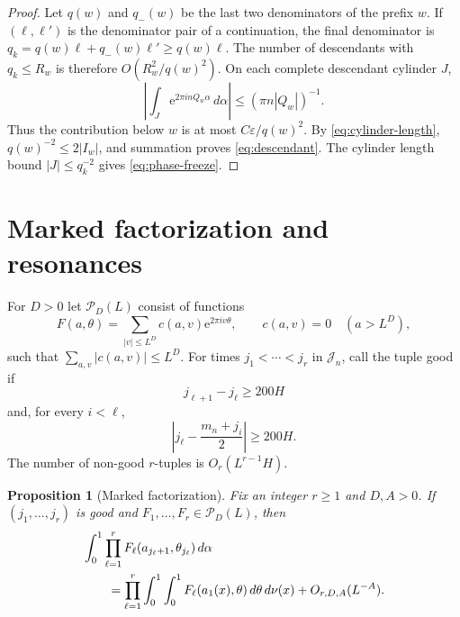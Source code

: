 \documentclass[11pt,a4paper]{amsart}
\newtheorem{proposition}[theorem]{Proposition}
\theoremstyle{definition}
\theoremstyle{remark}
\newcommand{\e}{\mathrm e}
\begin{document}
\begin{proof}
Let $q(w)$ and $q_-(w)$ be the last two denominators of the prefix $w$.
If $(\ell,\ell')$ is the denominator pair of a continuation, the final
denominator is
$q_k=q(w)\ell+q_-(w)\ell'\ge q(w)\ell$.  The number of descendants with
$q_k\le R_w$ is therefore $O(R_w^2/q(w)^2)$.  On each complete descendant
cylinder $J$,
\[
 \left|\int_J\e^{2\pi i nQ_w\alpha}\,d\alpha\right|
 \le(\pi n|Q_w|)^{-1}.
\]
Thus the contribution below $w$ is at most $C\varepsilon/q(w)^2$.  By
\eqref{eq:cylinder-length}, $q(w)^{-2}\le2|I_w|$, and summation proves
\eqref{eq:descendant}.  The cylinder length bound $|J|\le q_k^{-2}$ gives
\eqref{eq:phase-freeze}.
\end{proof}


\section{Marked factorization and resonances}

For $D>0$ let $\mathcal P_D(L)$ consist of functions
\begin{equation}\label{eq:one-time-poly}
 F(a,\theta)=\sum_{|v|\le L^D}c(a,v)\e^{2\pi iv\theta},
 \qquad c(a,v)=0\quad(a>L^D),
\end{equation}
such that $\sum_{a,v}|c(a,v)|\le L^D$.  For times
$j_1<\cdots<j_r$ in $\mathcal J_n$, call the tuple good if
\begin{equation}\label{eq:good-tuple-separation}
 j_{\ell+1}-j_\ell\ge200H
\end{equation}
and, for every $i<\ell$,
\begin{equation}\label{eq:good-tuple-resonance}
 \left|j_\ell-\frac{m_n+j_i}{2}\right|\ge200H.
\end{equation}
The number of non-good $r$-tuples is $O_r(L^{r-1}H)$.

\begin{proposition}[Marked factorization]\label{prop:marked-factorization}
Fix an integer $r\ge1$ and $D,A>0$.  If $(j_1,\ldots,j_r)$ is good and
$F_1,\ldots,F_r\in\mathcal P_D(L)$, then
\begin{align}\label{eq:marked-factorization}
 &\int_0^1\prod_{\ell=1}^r
 F_\ell(a_{j_\ell+1},\theta_{j_\ell})\,d\alpha\\
 &\qquad=
 \prod_{\ell=1}^r\int_0^1\int_0^1
 F_\ell(a_1(x),\theta)\,d\theta\,d\nu(x)
 +O_{r,D,A}(L^{-A}).\notag
\end{align}
\end{proposition}
\end{document}
